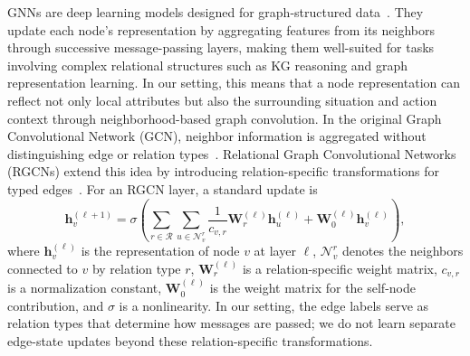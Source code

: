 \documentclass[letterpaper, 10 pt, conference]{ieeeconf}  %
\begin{document}
GNNs are deep learning models designed for graph-structured data~\cite{4700287}. They
update each node's representation by aggregating features from its neighbors through
successive message-passing layers, making them well-suited for tasks involving complex
relational structures such as KG reasoning and graph representation learning. In our
setting, this means that a node representation can reflect not only local attributes but
also the surrounding situation and action context through neighborhood-based graph
convolution. In the original Graph Convolutional Network (GCN), neighbor information is
aggregated without distinguishing edge or relation types~\cite{DBLP:journals/corr/KipfW16}.
Relational Graph Convolutional Networks (RGCNs) extend this idea by introducing
relation-specific transformations for typed edges~\cite{schlichtkrull2017modelingrelationaldatagraph}.
For an RGCN layer, a standard update is
\[
\mathbf{h}_v^{(\ell+1)} = \sigma\!\left( \sum_{r \in \mathcal{R}} \sum_{u \in \mathcal{N}_v^r}
\frac{1}{c_{v,r}} \mathbf{W}_r^{(\ell)} \mathbf{h}_u^{(\ell)} + \mathbf{W}_0^{(\ell)}
\mathbf{h}_v^{(\ell)} \right),
\]
where $\mathbf{h}_v^{(\ell)}$ is the representation of node $v$ at layer $\ell$,
$\mathcal{N}_v^r$ denotes the neighbors connected to $v$ by relation type $r$,
$\mathbf{W}_r^{(\ell)}$ is a relation-specific weight matrix, $c_{v,r}$ is a
normalization constant, $\mathbf{W}_0^{(\ell)}$ is the weight matrix for the self-node
contribution, and $\sigma$ is a nonlinearity. In our setting, the edge labels serve as
relation types that determine how messages are passed; we do not learn separate
edge-state updates beyond these relation-specific transformations.
\end{document}
